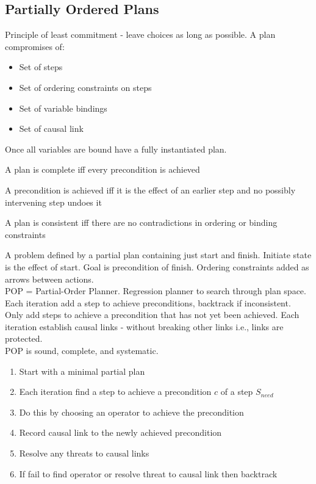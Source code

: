 \documentclass[a4paper]{article}
\theoremstyle{plain}
\theoremstyle{definition}
\newtheorem{defn}{Definition}[section]
\theoremstyle{remark}
\begin{document}
\subsection{Partially Ordered Plans}
Principle of least commitment - leave choices as long as possible. A plan compromises of:
\begin{itemize}
	\item Set of steps
	\item Set of ordering constraints on steps
	\item Set of variable bindings
	\item Set of causal link
\end{itemize}
Once all variables are bound have a fully instantiated plan.
\begin{tcolorbox}[colback=black!3!white,colframe=black!60!white,title=\begin{defn}Complete \label{Complete}\end{defn}]
A plan is complete iff every precondition is achieved
\end{tcolorbox}
A precondition is achieved iff it is the effect of an earlier step and no possibly intervening step undoes it
\begin{tcolorbox}[colback=black!3!white,colframe=black!60!white,title=\begin{defn}Consistent \label{Consistent}\end{defn}]
A plan is consistent iff there are no contradictions in ordering or binding constraints
\end{tcolorbox}
A problem defined by a partial plan containing just start and finish. Initiate state is the effect of start. Goal is precondition of finish. Ordering constraints added as arrows between actions. \\
POP = Partial-Order Planner. Regression planner to search through plan space. Each iteration add a step to achieve preconditions, backtrack if inconsistent. \\
Only add steps to achieve a precondition that has not yet been achieved. Each iteration establish causal links - without breaking other links i.e., links are protected. \\
POP is sound, complete, and systematic.
\begin{enumerate}
	\item Start with a minimal partial plan
	\item Each iteration find a step to achieve a precondition $c$ of a step $S_{need}$ 
	\item Do this by choosing an operator to achieve the precondition
	\item Record causal link to the newly achieved precondition
	\item Resolve any threats to causal links
	\item If fail to find operator or resolve threat to causal link then backtrack
\end{enumerate}
\end{document}

